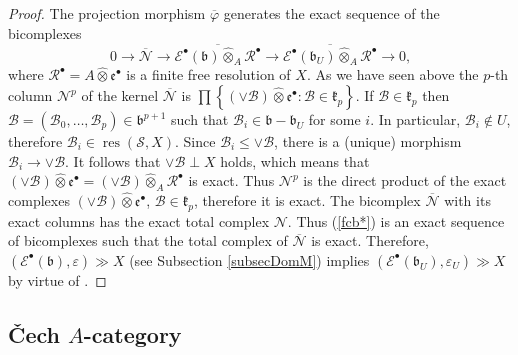 \documentclass[12pt]{amsart}%
\theoremstyle{plain}
\numberwithin{equation}{section}
\numberwithin{equation}{section}
\numberwithin{theorem}{section}
\numberwithin{lemma}{section}
\numberwithin{remark}{section}
\numberwithin{example}{section}
\numberwithin{proposition}{section}
\numberwithin{definition}{section}
\numberwithin{corollary}{section}
\begin{document}
\begin{proof}
The projection morphism $\overline{\varphi}$ generates the exact sequence of
the bicomplexes%
\begin{equation}
0\rightarrow\overline{\mathcal{N}}\rightarrow\overline{\mathcal{E}^{\bullet
}\left(  \mathfrak{b}\right)  \widehat{\otimes}_{A}\mathcal{R}^{\bullet}%
}\rightarrow\overline{\mathcal{E}^{\bullet}\left(  \mathfrak{b}_{U}\right)
\widehat{\otimes}_{A}\mathcal{R}^{\bullet}}\rightarrow0\text{,} \label{fcb*}%
\end{equation}
where $\mathcal{R}^{\bullet}=A\widehat{\otimes}\mathfrak{e}^{\bullet}$ is a
finite free resolution of $X$. As we have seen above the $p$-th column
$\mathcal{N}^{p}$ of the kernel $\overline{\mathcal{N}}$ is $\prod\left\{
\left(  \vee\mathcal{B}\right)  \widehat{\otimes}\mathfrak{e}^{\bullet
}:\mathcal{B}\in\mathfrak{k}_{p}\right\}  $. If $\mathcal{B}\in\mathfrak{k}%
_{p}$ then $\mathcal{B}=\left(  \mathcal{B}_{0},\ldots,\mathcal{B}_{p}\right)
\in\mathfrak{b}^{p+1}$ such that $\mathcal{B}_{i}\in\mathfrak{b-b}_{U}$ for
some $i$. In particular, $\mathcal{B}_{i}\notin U$, therefore $\mathcal{B}%
_{i}\in\operatorname{res}\left(  \mathcal{S},X\right)  $. Since $\mathcal{B}%
_{i}\leq\vee\mathcal{B}$, there is a (unique) morphism $\mathcal{B}%
_{i}\rightarrow\vee\mathcal{B}$. It follows that $\vee\mathcal{B}\perp X$
holds, which means that $\left(  \vee\mathcal{B}\right)  \widehat{\otimes
}\mathfrak{e}^{\bullet}=\left(  \vee\mathcal{B}\right)  \widehat{\otimes}%
_{A}\mathcal{R}^{\bullet}$ is exact. Thus $\mathcal{N}^{p}$ is the direct
product of the exact complexes $\left(  \vee\mathcal{B}\right)
\widehat{\otimes}\mathfrak{e}^{\bullet}$, $\mathcal{B}\in\mathfrak{k}_{p}$,
therefore it is exact. The bicomplex $\overline{\mathcal{N}}$ with its exact
columns has the exact total complex $\mathcal{N}$. Thus (\ref{fcb*}) is an
exact sequence of bicomplexes such that the total complex of $\overline
{\mathcal{N}}$ is exact. Therefore, $\left(  \mathcal{E}^{\bullet}\left(
\mathfrak{b}\right)  ,\varepsilon\right)  \gg X$ (see Subsection
\ref{subsecDomM}) implies $\left(  \mathcal{E}^{\bullet}\left(  \mathfrak{b}%
_{U}\right)  ,\varepsilon_{U}\right)  \gg X$ by virtue of \cite[Lemma
2.3]{DosJOT10}.
\end{proof}

\subsection{\v{C}ech $A$-category}
\end{document}
